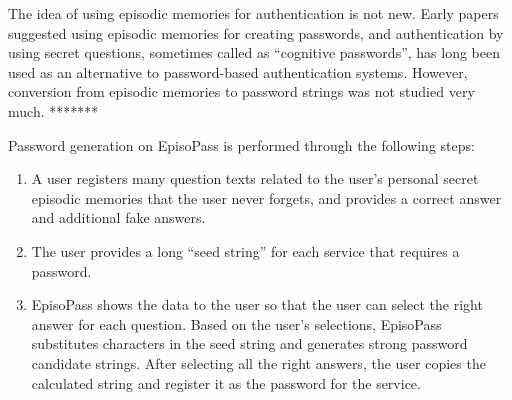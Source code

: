\documentclass[runningheads,a4paper]{llncs}
\begin{document}
% 

The idea of using episodic memories for authentication is not new.
Early papers suggested using episodic memories for creating passwords, and
authentication by using secret questions,
sometimes called as ``cognitive passwords'', has long been used as an
alternative to password-based authentication systems.
%
However, conversion from episodic memories to password strings
was not studied very much. *******

Password generation on EpisoPass is performed through the following steps:

\begin{enumerate}
\item A user registers many question texts related to the user's personal
secret episodic memories that the user never forgets,
and provides a correct answer and additional fake answers.

\item The user provides a long ``seed string'' for each service that requires
a password.

\item EpisoPass shows the data to the user so that
the user can select the right answer for each question.
Based on the user's selections,
EpisoPass substitutes characters in the seed string and generates
strong password candidate strings.
After selecting all the right answers,
the user copies the calculated string
and register it as the password for the service.
\end{enumerate}
\end{document}
